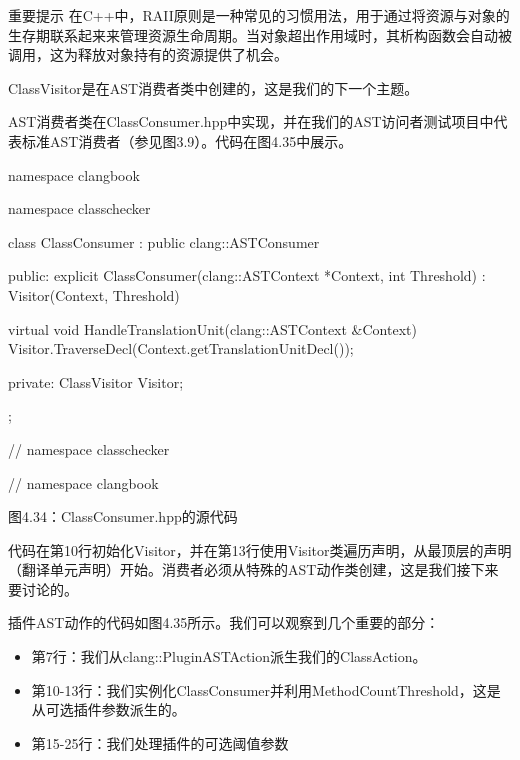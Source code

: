 \begin{myNotic}{重要提示}
在C++中，RAII原则是一种常见的习惯用法，用于通过将资源与对象的生存期联系起来来管理资源生命周期。当对象超出作用域时，其析构函数会自动被调用，这为释放对象持有的资源提供了机会。
\end{myNotic}

ClassVisitor是在AST消费者类中创建的，这是我们的下一个主题。


AST消费者类在ClassConsumer.hpp中实现，并在我们的AST访问者测试项目中代表标准AST消费者（参见图3.9）。代码在图4.35中展示。

\begin{cpp}
namespace clangbook {
namespace classchecker {
class ClassConsumer : public clang::ASTConsumer {
public:
  explicit ClassConsumer(clang::ASTContext *Context, int Threshold)
    : Visitor(Context, Threshold) {}

  virtual void HandleTranslationUnit(clang::ASTContext &Context) {
    Visitor.TraverseDecl(Context.getTranslationUnitDecl());
  }

private:
  ClassVisitor Visitor;
};
} // namespace classchecker
} // namespace clangbook
\end{cpp}

\begin{center}
图4.34：ClassConsumer.hpp的源代码
\end{center}

代码在第10行初始化Visitor，并在第13行使用Visitor类遍历声明，从最顶层的声明（翻译单元声明）开始。消费者必须从特殊的AST动作类创建，这是我们接下来要讨论的。


插件AST动作的代码如图4.35所示。我们可以观察到几个重要的部分：

\begin{itemize}
\item
第7行：我们从clang::PluginASTAction派生我们的ClassAction。

\item
第10-13行：我们实例化ClassConsumer并利用MethodCountThreshold，这是从可选插件参数派生的。

\item
第15-25行：我们处理插件的可选阈值参数
\end{itemize}

